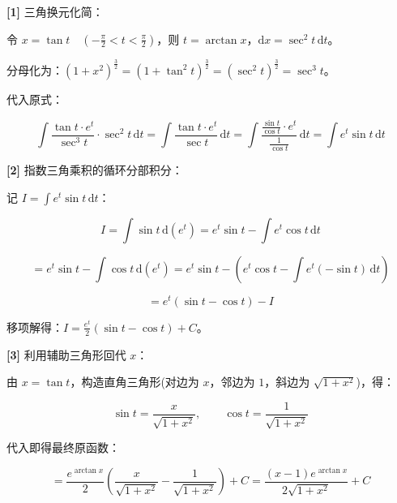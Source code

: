 \documentclass[11pt,a4paper,UTF8]{ctexart}
\begin{document}
\begin{solbox}[分步推导与答题规范]
\textbf{[1]} 三角换元化简：

令 $x = \tan t \quad \left(-\frac{\pi}{2} < t < \frac{\pi}{2}\right)$，则 $t = \arctan x$，$\mathrm{d}x = \sec^2 t\,\mathrm{d}t$。

分母化为：$(1+x^2)^{\frac{3}{2}} = (1+\tan^2 t)^{\frac{3}{2}} = (\sec^2 t)^{\frac{3}{2}} = \sec^3 t$。

代入原式：


\begin{equation*}
\int \frac{\tan t \cdot e^t}{\sec^3 t} \cdot \sec^2 t\,\mathrm{d}t = \int \frac{\tan t \cdot e^t}{\sec t}\,\mathrm{d}t = \int \frac{\frac{\sin t}{\cos t} \cdot e^t}{\frac{1}{\cos t}}\,\mathrm{d}t = \int e^t \sin t\,\mathrm{d}t
\end{equation*}


\textbf{[2]} 指数三角乘积的循环分部积分：

记 $I = \int e^t \sin t\,\mathrm{d}t$：


\begin{equation*}
I = \int \sin t\,\mathrm{d}(e^t) = e^t \sin t - \int e^t \cos t\,\mathrm{d}t
\end{equation*}



\begin{equation*}
= e^t \sin t - \int \cos t\,\mathrm{d}(e^t) = e^t \sin t - \left(e^t \cos t - \int e^t (-\sin t)\,\mathrm{d}t\right)
\end{equation*}



\begin{equation*}
= e^t (\sin t - \cos t) - I
\end{equation*}


移项解得：$I = \frac{e^t}{2}(\sin t - \cos t) + C$。

\textbf{[3]} 利用辅助三角形回代 $x$：

由 $x = \tan t$，构造直角三角形(对边为 $x$，邻边为 $1$，斜边为 $\sqrt{1+x^2}$)，得：


\begin{equation*}
\sin t = \frac{x}{\sqrt{1+x^2}}, \qquad \cos t = \frac{1}{\sqrt{1+x^2}}
\end{equation*}


代入即得最终原函数：


\begin{equation*}
= \frac{e^{\arctan x}}{2}\left(\frac{x}{\sqrt{1+x^2}} - \frac{1}{\sqrt{1+x^2}}\right) + C = \frac{(x-1)e^{\arctan x}}{2\sqrt{1+x^2}} + C
\end{equation*}

\end{solbox}
\end{document}
